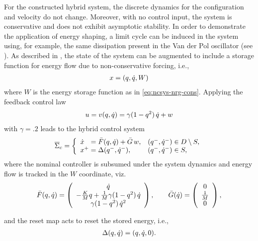 For the constructed hybrid system, the discrete dynamics for the configuration
and velocity do not change.
%
Moreover, with no control input, the system is conservative and does not exhibit
asymptotic stability.
%
In order to demonstrate the application of energy shaping, a limit cycle can be
induced in the system using, for example, the same dissipation present in the
Van der Pol oscillator (see \cite[pp.~13]{Khalil2002}).
%
As described in , the state of the system can be
augmented to include a storage function for energy flow due to non-conservative
forcing, i.e.,
\begin{align*}
  x = (q, \dot{q}, W)
\end{align*}
where $W$ is the energy storage function as in \eqref{eq:ncsys-nrg-cons}.
%
Applying the feedback control law
\begin{align}
  \label{eq:spring_cart_vdp_controller}
  u = v(q, \dot{q}) = \gamma(1 - q^{2}) \, \dot{q} + w
\end{align}
with $\gamma = .2$ leads to the hybrid control system
\begin{align}
  \label{eq:hcs_cart_spring}
  {\overline {\Sigma}}_{c} = \left\{
  \begin{array}{l l}
    {\dot {x}}\hphantom{^+} = {\bar {F}}(q, \dot{q}) + {\bar {G}} \, w, & (q^{-}, \dot{q}^{-}) \in D \setminus S,\\
    x^{+} = \Delta(q^{-}, \dot{q}^{-}), & (q^{-}, \dot{q}^{-}) \in S,
  \end{array}\right.
\end{align}
where the nominal controller is subsumed under the system dynamics and energy
flow is tracked in the $W$ coordinate, viz.
\begin{align*}
  {\bar {F}}(q, \dot{q}) = \left(\begin{array}{c}
      \dot{q}\\
      -\frac{K}{M} q + \frac{1}{M} \gamma(1 - q^{2}) \, \dot{q}\\
      \gamma(1 - q^{2}) \, \dot{q}^{2}
    \end{array}\right), \qquad
  {\bar {G}}(\dot{q}) = \left(\begin{array}{c}
      0\\
      \frac{1}{M}\\
      0
    \end{array}\right),
\end{align*}

and the reset map acts to reset the stored energy, i.e.,
\begin{align*}
  \Delta(q, \dot{q}) = (q, \dot{q}, 0).
\end{align*}

